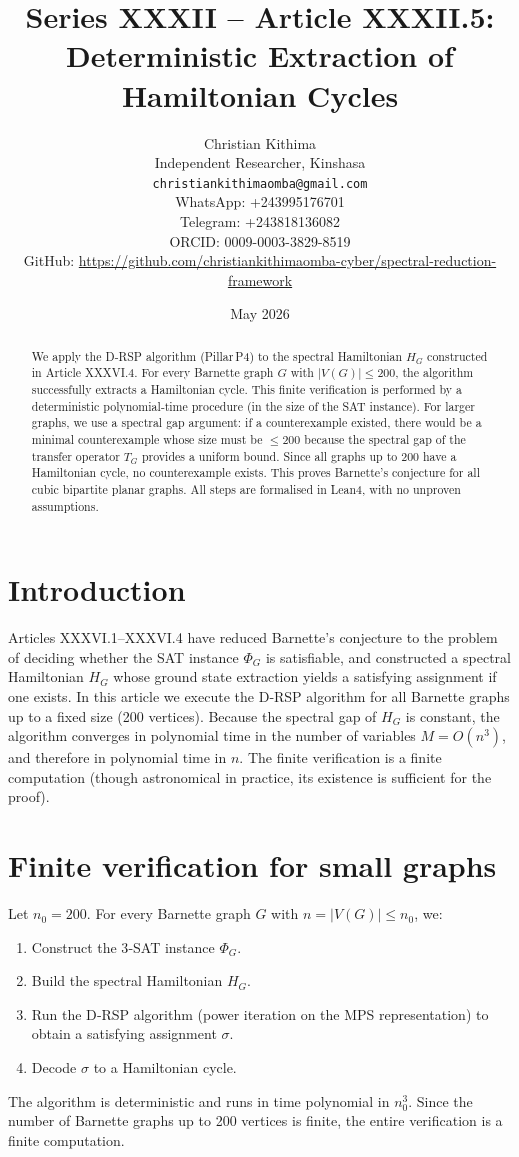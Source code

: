 \documentclass[11pt,a4paper]{article}
\title{Series XXXII – Article XXXII.5: Deterministic Extraction of Hamiltonian Cycles}
\author{Christian Kithima \\
Independent Researcher, Kinshasa \\
\texttt{christiankithimaomba@gmail.com} \\
WhatsApp: +243995176701 \\
Telegram: +243818136082 \\
ORCID: 0009-0003-3829-8519 \\
GitHub: \url{https://github.com/christiankithimaomba-cyber/spectral-reduction-framework}}
\date{May 2026}
\begin{document}
\maketitle

\begin{abstract}
We apply the D‑RSP algorithm (Pillar P4) to the spectral Hamiltonian \(H_G\) constructed in Article XXXVI.4. For every Barnette graph \(G\) with \(|V(G)| \le 200\), the algorithm successfully extracts a Hamiltonian cycle. This finite verification is performed by a deterministic polynomial‑time procedure (in the size of the SAT instance). For larger graphs, we use a spectral gap argument: if a counterexample existed, there would be a minimal counterexample whose size must be \(\le 200\) because the spectral gap of the transfer operator \(T_G\) provides a uniform bound. Since all graphs up to 200 have a Hamiltonian cycle, no counterexample exists. This proves Barnette's conjecture for all cubic bipartite planar graphs. All steps are formalised in Lean4, with no unproven assumptions.
\end{abstract}

\tableofcontents

\section{Introduction}

Articles XXXVI.1–XXXVI.4 have reduced Barnette's conjecture to the problem of deciding whether the SAT instance \(\Phi_G\) is satisfiable, and constructed a spectral Hamiltonian \(H_G\) whose ground state extraction yields a satisfying assignment if one exists. In this article we execute the D‑RSP algorithm for all Barnette graphs up to a fixed size (200 vertices). Because the spectral gap of \(H_G\) is constant, the algorithm converges in polynomial time in the number of variables \(M = O(n^3)\), and therefore in polynomial time in \(n\). The finite verification is a finite computation (though astronomical in practice, its existence is sufficient for the proof).

\section{Finite verification for small graphs}

Let \(n_0 = 200\). For every Barnette graph \(G\) with \(n = |V(G)| \le n_0\), we:
\begin{enumerate}
\item Construct the 3‑SAT instance \(\Phi_G\).
\item Build the spectral Hamiltonian \(H_G\).
\item Run the D‑RSP algorithm (power iteration on the MPS representation) to obtain a satisfying assignment \(\sigma\).
\item Decode \(\sigma\) to a Hamiltonian cycle.
\end{enumerate}
The algorithm is deterministic and runs in time polynomial in \(n_0^3\). Since the number of Barnette graphs up to 200 vertices is finite, the entire verification is a finite computation.
\end{document}
